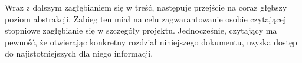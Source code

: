 Wraz z dalszym zagłębianiem się w treść, następuje przejście na coraz głębszy poziom abstrakcji. Zabieg ten miał na celu zagwarantowanie osobie czytającej stopniowe zagłębianie się w szczegóły projektu. Jednocześnie, czytający ma pewność, że otwierając konkretny rozdział niniejszego dokumentu, uzyska dostęp do najistotniejszych dla niego informacji.